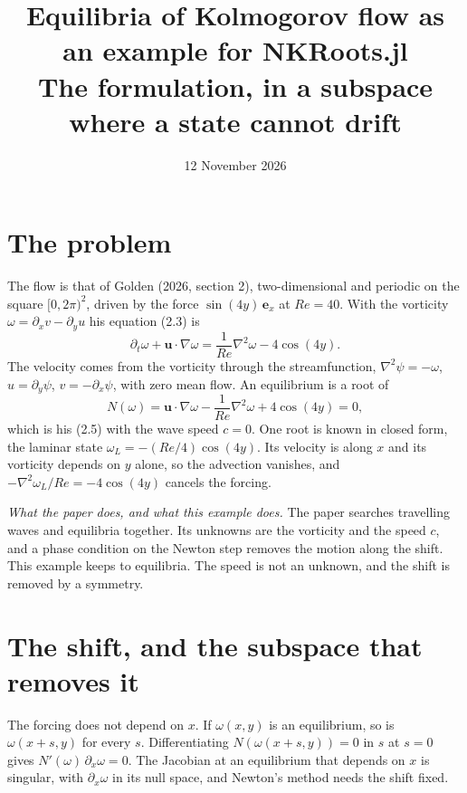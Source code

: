 \documentclass[11pt,a4paper]{article}
\title{Equilibria of Kolmogorov flow as an example for NKRoots.jl\\[2pt]\large The formulation, in a subspace where a state cannot drift}
\author{}
\date{12 November 2026}
\newcommand{\Rey}{\mathit{Re}}
\newcommand{\om}{\omega}
\begin{document}
\maketitle

\section{The problem}

The flow is that of Golden (2026, section 2), two-dimensional and periodic on the square $[0, 2\pi)^2$, driven by the force $\sin(4y)\,\mathbf e_x$ at $\Rey = 40$. With the vorticity $\om = \partial_x v - \partial_y u$ his equation (2.3) is
\begin{equation}
\partial_t\om + \mathbf u\cdot\nabla\om = \frac{1}{\Rey}\nabla^2\om - 4\cos(4y).
\label{eq:vort}
\end{equation}
The velocity comes from the vorticity through the streamfunction, $\nabla^2\psi = -\om$, $u = \partial_y\psi$, $v = -\partial_x\psi$, with zero mean flow. An equilibrium is a root of
\begin{equation}
N(\om) = \mathbf u\cdot\nabla\om - \frac{1}{\Rey}\nabla^2\om + 4\cos(4y) = 0,
\label{eq:N}
\end{equation}
which is his (2.5) with the wave speed $c = 0$. One root is known in closed form, the laminar state $\om_L = -(\Rey/4)\cos(4y)$. Its velocity is along $x$ and its vorticity depends on $y$ alone, so the advection vanishes, and $-\nabla^2\om_L/\Rey = -4\cos(4y)$ cancels the forcing.

\emph{What the paper does, and what this example does.} The paper searches travelling waves and equilibria together. Its unknowns are the vorticity and the speed $c$, and a phase condition on the Newton step removes the motion along the shift. This example keeps to equilibria. The speed is not an unknown, and the shift is removed by a symmetry.

\section{The shift, and the subspace that removes it}

The forcing does not depend on $x$. If $\om(x, y)$ is an equilibrium, so is $\om(x + s, y)$ for every $s$. Differentiating $N(\om(x + s, y)) = 0$ in $s$ at $s = 0$ gives $N'(\om)\,\partial_x\om = 0$. The Jacobian at an equilibrium that depends on $x$ is singular, with $\partial_x\om$ in its null space, and Newton's method needs the shift fixed.
\end{document}
